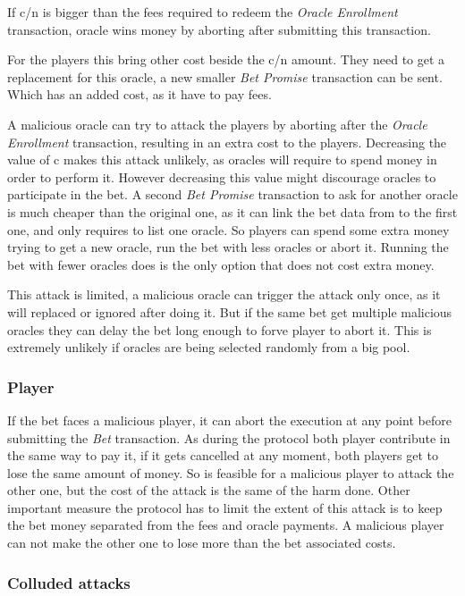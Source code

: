 If c/n is bigger than the fees required to redeem the
  \textit{Oracle Enrollment} transaction, oracle wins money by aborting after
  submitting this transaction.

For the players this bring other cost beside the c/n amount.
They need to get a replacement for this oracle, a new smaller
  \textit{Bet Promise} transaction can be sent.
Which has an added cost, as it have to pay fees.

A malicious oracle can try to attack the players by aborting after the
  \textit{Oracle Enrollment} transaction, resulting in an extra cost to the
  players.
Decreasing the value of c makes this attack unlikely, as oracles will require
  to spend money in order to perform it.
However decreasing this value might discourage oracles to participate in the
  bet.
A second \textit{Bet Promise} transaction to ask for another oracle is much
  cheaper than the original one, as it can link the bet data from to the first
  one, and only requires to list one oracle.
So players can spend some extra money trying to get a new oracle, run the bet
  with less oracles or abort it.
Running the bet with fewer oracles does is the only option that does not cost
  extra money.

This attack is limited, a malicious oracle can trigger the attack only once, as
  it will replaced or ignored after doing it.
But if the same bet get multiple malicious oracles they can delay the bet long
  enough to forve player to abort it.
This is extremely unlikely if oracles are being selected randomly from a big
  pool.

\subsubsection{Player} \label{subsec:individual_attack_player}
If the bet faces a malicious player, it can abort the execution at any point
  before submitting the \textit{Bet} transaction.
As during the protocol both player contribute in the same way to pay it, if it
  gets cancelled at any moment, both players get to lose the same amount of
  money.
So is feasible for a malicious player to attack the other one, but the cost
  of the attack is the same of the harm done.
Other important measure the protocol has to limit the extent of this attack
  is to keep the bet money separated from the fees and oracle payments.
A malicious player can not make the other one to lose more than the bet
  associated costs.

\subsubsection{Colluded attacks}\label{subsec:colluded_attacks}

